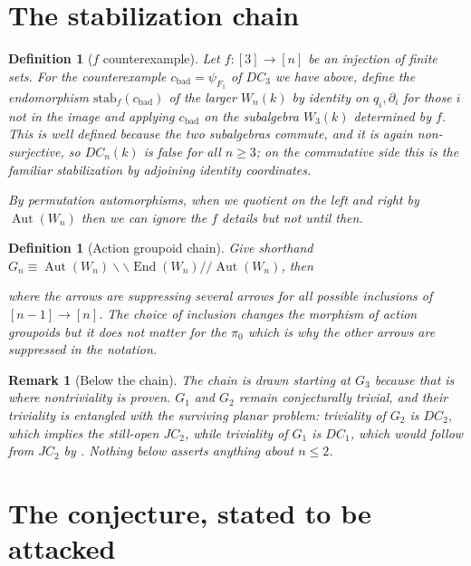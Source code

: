 \documentclass[11pt]{article}
\theoremstyle{change}
\newtheorem{definition}[equation]{Definition}
\newtheorem{remark}[equation]{Remark}
\theoremstyle{nonumberplain}
\numberwithin{equation}{section}
\DeclareMathOperator{\End}{End}
\DeclareMathOperator{\Aut}{Aut}
\begin{document}
\section{The stabilization chain}

\begin{definition}[$f$ counterexample]
Let $f : [3] \to [n]$ be an injection of finite sets. For the counterexample $c_{\text{bad}} = \psi_{F_1}$ of $DC_3$ we have above, define the endomorphism $\mathrm{stab}_f(c_{\text{bad}})$ of the larger $W_n (k)$ by identity on $q_i, \partial_i$ for those $i$ not in the image and applying $c_{\text{bad}}$ on the subalgebra $W_3 (k)$ determined by $f$. This is well defined because the two subalgebras commute, and it is again non-surjective, so $DC_n(k)$ is false for all $n \geq 3$; on the commutative side this is the familiar stabilization by adjoining identity coordinates.

By permutation automorphisms, when we quotient on the left and right by $\Aut (W_n)$ then we can ignore the $f$ details but not until then.
\end{definition}

\begin{definition}[Action groupoid chain]

Give shorthand $G_n \equiv \Aut(W_n) \backslash \backslash \End(W_n) / / \Aut(W_n)$, then


where the arrows are suppressing several arrows for all possible inclusions of $[n-1] \to [n]$. The choice of inclusion changes the morphism of action groupoids but it does not matter for the $\pi_0$ which is why the other arrows are suppressed in the notation.

\end{definition}

\begin{remark}[Below the chain]
The chain is drawn starting at $G_3$ because that is where nontriviality is proven. $G_1$ and $G_2$ remain conjecturally trivial, and their triviality is entangled with the surviving planar problem: triviality of $G_2$ is $DC_2$, which implies the still-open $JC_2$, while triviality of $G_1$ is $DC_1$, which would follow from $JC_2$ by \cite{BKK}. Nothing below asserts anything about $n \leq 2$.
\end{remark}

\section{The conjecture, stated to be attacked\label{conjsec}}
\end{document}

